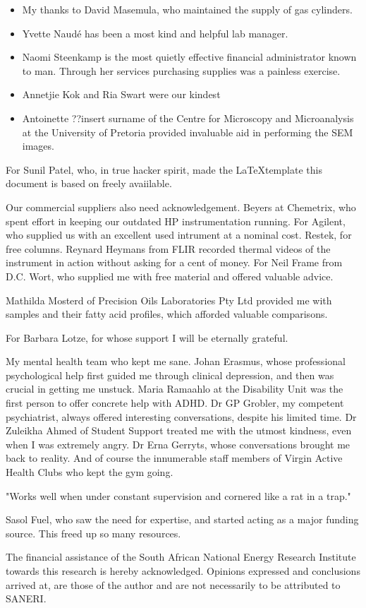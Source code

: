 \documentclass[
11pt, %
english, %
singlespacing, %
headsepline, %
]{MastersDoctoralThesis} %
\begin{document}
\begin{acknowledgements}
\begin{itemize}
\item My thanks to David Masemula, who maintained the supply of gas cylinders.

\item Yvette Naudé has been a most kind and helpful lab manager.

\item Naomi Steenkamp is the most quietly effective financial administrator known to
man. Through her services purchasing supplies was a painless exercise.
\item Annetjie Kok and Ria Swart were our kindest

\item Antoinette ??insert surname of the Centre for Microscopy and Microanalysis at
the University of Pretoria provided invaluable aid in performing the SEM images.

\end{itemize}

For Sunil Patel, who, in true hacker spirit, made the \LaTeX template this
document is based on freely avaiilable.

Our commercial suppliers also need acknowledgement. Beyers at Chemetrix, who
spent effort in keeping our outdated HP instrumentation running. For Agilent,
who supplied us with an excellent used intrument at a nominal cost. Restek, for
free columns. Reynard Heymans from FLIR recorded thermal videos of the
instrument in action without asking for a cent of money. For Neil Frame from
D.C. Wort, who supplied me with free material and offered valuable advice.

Mathilda Mosterd of Precision Oils Laboratories Pty Ltd provided me with samples and their
fatty acid profiles, which afforded valuable comparisons.

For Barbara Lotze, for whose support I will be eternally grateful. 

My mental health team who kept me sane. Johan Erasmus, whose professional
psychological help first guided me through clinical depression, and then was
crucial in getting me unstuck. Maria Ramaahlo at the Disability Unit was the
first person to offer concrete help with ADHD. Dr GP Grobler, my competent
psychiatrist, always offered interesting conversations, despite his limited
time. Dr Zuleikha Ahmed of Student Support treated me with the
utmost kindness, even when I was extremely angry. Dr Erna Gerryts, whose
conversations brought me back to reality. And of course the innumerable staff
members of Virgin Active Health Clubs who kept the gym going. 

 "Works well when under constant supervision and cornered like a rat in a trap."


Sasol Fuel, who saw the need for expertise, and started acting as a major
funding source. This freed up so many resources.

The financial assistance of the South African National Energy Research Institute
towards this research is hereby acknowledged. Opinions expressed and conclusions
arrived at, are those of the author and are not necessarily to be attributed to
SANERI.

\end{acknowledgements}
\end{document}
